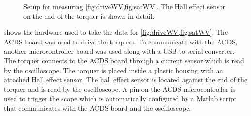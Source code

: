 \begin{figure}[H]
    \centering
    \caption{Setup for measuring \cref{fig:driveWV,fig:satWV}. The Hall effect sensor on the end of the torquer is shown in detail.}
    \label{fig:WVsetup}
\end{figure}

 shows the hardware used to take the data for \cref{fig:driveWV,fig:satWV}. The \ac{ACDS} board was used to drive the torquers. To communicate with the \ac{ACDS}, another microcontroller board was used along with a \ac{USB}-to-serial converter. The torquer connects to the \ac{ACDS} board through a current sensor which is read by the oscilloscope. The torquer is placed inside a plastic housing with an attached Hall effect sensor. The hall effect sensor is located against the end of the torquer and is read by the oscilloscope. A pin on the \ac{ACDS} microcontroller is  used to trigger the scope which is automatically configured by a Matlab script that communicates with the \ac{ACDS} board and the oscilloscope.


